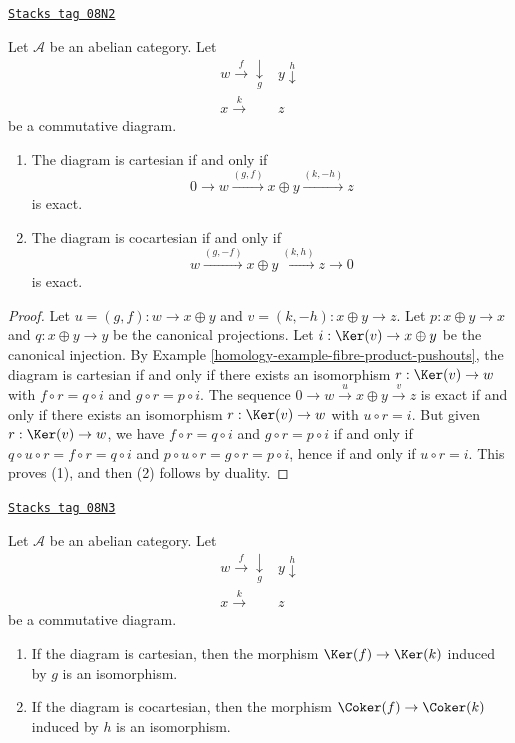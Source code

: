 \begin{lemma}
\label{homology-lemma-characterize-cartesian}
\href{https://stacks.math.columbia.edu/tag/08N2}{\texttt{Stacks tag 08N2}}

Let $\mathcal{A}$ be an abelian category. Let
$$
\begin{array}{cc}w\overset{f}{\longrightarrow}\underset{g}{\downarrow} & y\overset{h}{\downarrow} \\ x\overset{k}{\longrightarrow} & z\end{array}
$$
be a commutative diagram.
\begin{enumerate}
\item The diagram is cartesian if and only if
$$
0 \to w \xrightarrow{(g, f)} x \oplus y \xrightarrow{(k, -h)} z
$$
is exact.
\item The diagram is cocartesian if and only if
$$
w \xrightarrow{(g, -f)} x \oplus y \xrightarrow{(k, h)} z \to 0
$$
is exact.
\end{enumerate}
\end{lemma}

\begin{proof}

Let $u = (g, f) : w \to x \oplus y$ and $v = (k, -h) : x \oplus y \to z$.
Let $p : x \oplus y \to x$ and $q : x \oplus y \to y$ be the canonical
projections. Let $i : \Ker(v) \to x \oplus y$ be the canonical
injection. By Example \ref{homology-example-fibre-product-pushouts}, the diagram is
cartesian if and only if there exists an isomorphism
$r : \Ker(v) \to w$ with $f \circ r = q \circ i$ and
$g \circ r = p \circ i$. The sequence
$0 \to w \overset{u} \to x \oplus y \overset{v} \to z$ is exact if and
only if there exists an isomorphism $r : \Ker(v) \to w$ with
$u \circ r = i$. But given $r : \Ker(v) \to w$, we have
$f \circ r = q \circ i$ and $g \circ r = p \circ i$ if and
only if $q \circ u \circ r= f \circ r = q \circ i$ and
$p \circ u \circ r = g \circ r = p \circ i$, hence if and only if
$u \circ r = i$. This proves (1), and then (2) follows by duality.
\end{proof}

\begin{lemma}
\label{homology-lemma-cartesian-kernel}
\href{https://stacks.math.columbia.edu/tag/08N3}{\texttt{Stacks tag 08N3}}

Let $\mathcal{A}$ be an abelian category. Let
$$
\begin{array}{cc}w\overset{f}{\longrightarrow}\underset{g}{\downarrow} & y\overset{h}{\downarrow} \\ x\overset{k}{\longrightarrow} & z\end{array}
$$
be a commutative diagram.
\begin{enumerate}
\item If the diagram is cartesian, then the morphism
$\Ker(f)\to\Ker(k)$ induced by $g$ is an isomorphism.
\item If the diagram is cocartesian, then the morphism
$\Coker(f)\to\Coker(k)$ induced by $h$ is an isomorphism.
\end{enumerate}
\end{lemma}


